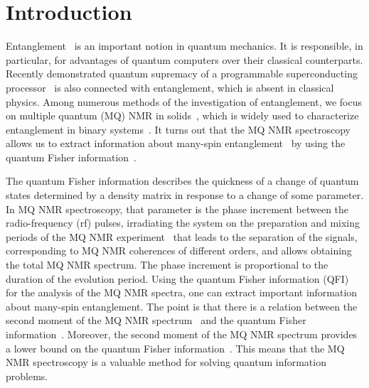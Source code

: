 
\section{Introduction}
\label{sec:1}

Entanglement~\cite{Nielsen_2009} is an important notion in quantum mechanics. It is responsible, in particular, for advantages of quantum computers over their classical counterparts.
Recently demonstrated quantum supremacy of a programmable superconducting processor~\cite{Arute2019} is also connected with entanglement, which is absent in classical physics.
Among numerous methods of the investigation of entanglement, we focus on multiple quantum (MQ) NMR in solids~\cite{Baum_1985}, which is widely used to characterize entanglement in binary systems~\cite{Furman_2008,Furman_2009,Fel_dman_2008,Fel_dman_2012}.
It turns out that the MQ NMR spectroscopy~\cite{Baum_1985} allows us to extract information about many-spin entanglement~\cite{G_rttner_2018} by using the quantum Fisher information~\cite{T_th_2014,Pezz__2018}.

The quantum Fisher information describes the quickness of a change of quantum states determined by a density matrix in response to a change of some parameter.
In MQ NMR spectroscopy, that parameter is the phase increment between the radio-frequency (rf) pulses, irradiating the system on the preparation and mixing periods of the MQ NMR experiment~\cite{Baum_1985}
that leads to the separation of the signals, corresponding to MQ NMR coherences of different orders, and allows obtaining the total MQ NMR spectrum.
The phase increment is proportional to the duration of the evolution period.
Using the quantum Fisher information (QFI)~\cite{Liu_2014} for the analysis of the MQ NMR spectra, one can extract important information about many-spin entanglement.
The point is that there is a relation between the second moment of the MQ NMR spectrum~\cite{Khitrin_1997} and the quantum Fisher information~\cite{G_rttner_2018,Doronin_2019}.
Moreover, the second moment of the MQ NMR spectrum provides a lower bound on the quantum Fisher information~\cite{G_rttner_2018}.
This means that the MQ NMR spectroscopy is a valuable method for solving quantum information problems.

